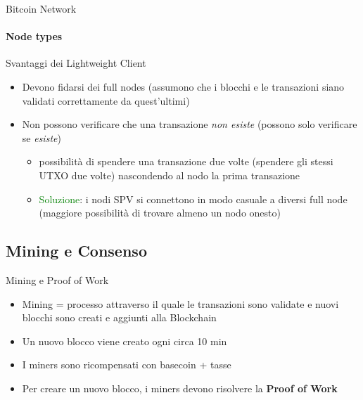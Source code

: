 \documentclass{beamer}
\begin{document}
  
  
  
  \begin{frame}{Bitcoin Network}
    \framesubtitle{Node types}
    \begin{block}{Svantaggi dei Lightweight Client}
        \begin{itemize}
            \item Devono fidarsi dei full nodes (assumono che i blocchi e le transazioni siano validati correttamente da quest'ultimi)
            \item Non possono verificare che una transazione \emph{non esiste} (possono solo verificare se \emph{esiste})
            \begin{itemize}
                \item[\MVRightarrow] possibilità di spendere una transazione due volte (spendere gli stessi UTXO due volte) nascondendo al nodo la prima transazione
                \pause
                \item[\MVRightarrow] \textcolor{green}{Soluzione}: i nodi SPV
                si connettono in modo casuale a diversi full node (maggiore possibilità di trovare almeno un nodo onesto) 
            \end{itemize}
        \end{itemize}
    \end{block}
  \end{frame}
  
  
  \subsection{Mining e Consenso}
  \begin{frame}{Mining e Proof of Work}
      \begin{itemize}
          \item Mining = processo attraverso il quale le transazioni sono validate e nuovi blocchi sono creati e aggiunti alla Blockchain
          \item Un nuovo blocco viene creato ogni circa 10 min 
          \item I miners sono ricompensati con basecoin + tasse
          \item Per creare un nuovo blocco, i miners devono risolvere la \textbf{Proof of Work}
      \end{itemize}
  \end{frame}
  
  
  
\end{document}

